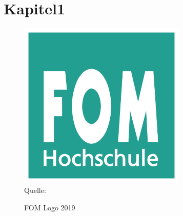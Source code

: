 \chapter{Kapitel1}
\blindtext{}\autocite{elk}

\begin{figure}[!htb]
  \centering
  \caption{FOM Logo 2019}
  \includegraphics[width=8cm]{Abbildungen/fom_logo.png} 
  \\Quelle: \cite[12]{becker2016data}
  \label{fom_logo}
\end{figure}

\blindtext{}